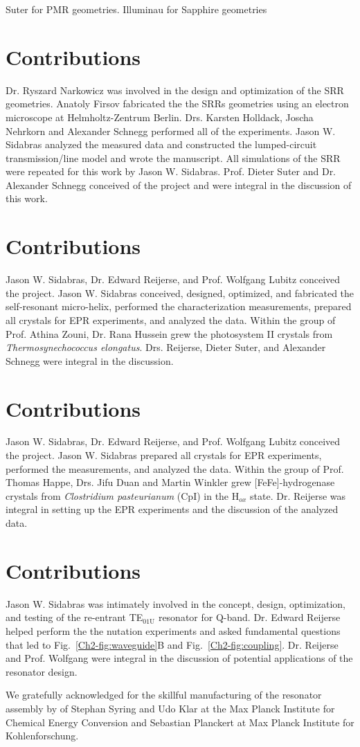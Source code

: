 
Suter for PMR geometries. Illuminau for Sapphire geometries

\section*{Contributions}
Dr. Ryszard Narkowicz was involved in the design and optimization of the SRR geometries. Anatoly Firsov fabricated the the SRRs geometries using an electron microscope at Helmholtz-Zentrum Berlin. Drs. Karsten Holldack, Joscha Nehrkorn and Alexander Schnegg performed all of the experiments. Jason W. Sidabras analyzed the measured data and constructed the lumped-circuit transmission\-/line model and wrote the manuscript. All simulations of the SRR were repeated for this work by Jason W. Sidabras. Prof. Dieter Suter and Dr. Alexander Schnegg conceived of the project and were integral in the discussion of this work.


\section*{Contributions} Jason W. Sidabras, Dr. Edward Reijerse, and Prof. Wolfgang Lubitz conceived the project. Jason W. Sidabras conceived, designed, optimized, and fabricated the self-resonant micro-helix, performed the characterization measurements, prepared all crystals for EPR experiments, and analyzed the data. Within the group of Prof. Athina Zouni, Dr. Rana Hussein grew the photosystem II crystals from {\em Thermosynechococcus elongatus}. Drs. Reijerse, Dieter Suter, and Alexander Schnegg were integral in the discussion. 


\section*{Contributions} Jason W. Sidabras, Dr. Edward Reijerse, and Prof. Wolfgang Lubitz conceived the project. Jason W. Sidabras prepared all crystals for EPR experiments, performed the measurements, and analyzed the data. Within the group of Prof. Thomas Happe, Drs. Jifu Duan and Martin Winkler grew [FeFe]-hydrogenase crystals from {\em Clostridium pasteurianum} (CpI) in the H$_{ox}$ state. Dr. Reijerse was integral in setting up the EPR experiments and the discussion of the analyzed data. 


\section*{Contributions}
Jason W. Sidabras was intimately involved in the concept, design, optimization, and testing of the re-entrant TE$_{01\text{U}}$ resonator for Q-band. Dr. Edward Reijerse helped perform the the nutation experiments and asked fundamental questions that led to Fig.~\ref{Ch2-fig:waveguide}B and Fig.~\ref{Ch2-fig:coupling}. Dr. Reijerse and Prof. Wolfgang were integral in the discussion of potential applications of the resonator design.

We gratefully acknowledged for the skillful manufacturing of the resonator assembly by of Stephan Syring and Udo Klar at the Max Planck Institute for Chemical Energy Conversion and Sebastian Planckert at Max Planck Institute for Kohlenforschung. 